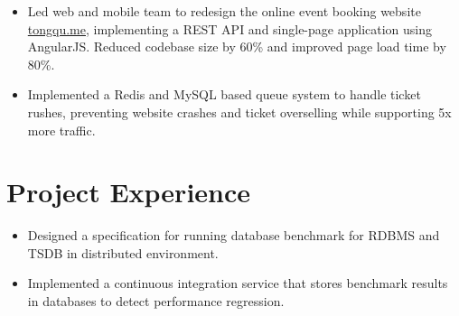 \documentclass[11pt, letterpaper]{simple-cv}
\begin{document}
\begin{itemize}
	\item Led web and mobile team to redesign the online event booking website \href{https://tongqu.me}{tongqu.me},
	implementing a REST API and single-page application using AngularJS.
	Reduced codebase size by 60\% and improved page load time by 80\%.
	\item Implemented a Redis and MySQL based queue system to handle ticket rushes, preventing website crashes and ticket overselling while supporting 5x more traffic.
\end{itemize}

\section{Project Experience}




\begin{itemize}
	\item Designed a specification for running database benchmark for RDBMS and TSDB in distributed environment.
	\item Implemented a continuous integration service that stores benchmark results in databases to detect performance regression.
\end{itemize}

\end{document}
